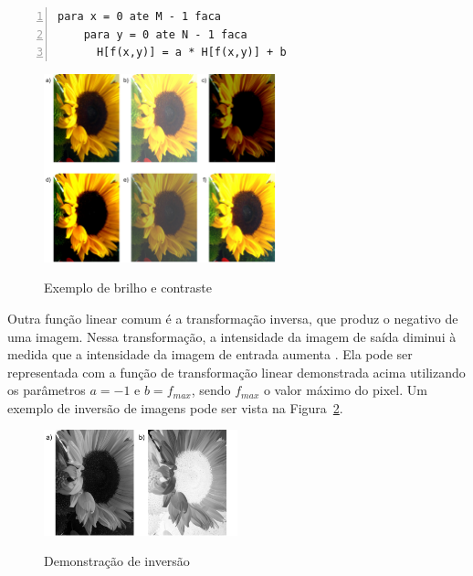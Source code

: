 \documentclass[12pt,oneside,a4paper,english,french,spanish,brazil,]{abntex2}
\begin{document}
\begin{minipage}{\linewidth}
\begin{lstlisting}[caption={Algoritmo para aplicação de brilho e contraste}, label=alg:Brilho_Contraste, numbers=left]
para x = 0 ate M - 1 faca
    para y = 0 ate N - 1 faca
      H[f(x,y)] = a * H[f(x,y)] + b
\end{lstlisting}
\end{minipage}

\begin{figure}[ht]
\centering
\caption{Exemplo de brilho e contraste}
\includegraphics[width=0.6\textwidth]{imagens/PDI_Brilho_e_Contraste.pdf}
\sourceAuthor
\label{fig:PDI_Brilho_e_Contraste}
\end{figure}

Outra função linear comum é a transformação inversa, que produz o negativo de uma imagem. Nessa transformação, a intensidade da imagem de saída diminui à medida que a intensidade da imagem de entrada aumenta \cite{pedrini:2008}. Ela pode ser representada com a função de transformação linear demonstrada acima utilizando os parâmetros \(a=-1\) e \(b=f_{max}\), sendo \(f_{max}\) o valor máximo do pixel. Um exemplo de inversão de imagens pode ser vista na Figura~\ref{fig:PDI_Inversao}.

\begin{figure}[ht]
\centering
\caption{Demonstração de inversão}
\includegraphics[width=0.5\textwidth]{imagens/PDI_Inversao.pdf}
\sourceAuthor
\label{fig:PDI_Inversao}
\end{figure}
\end{document}
